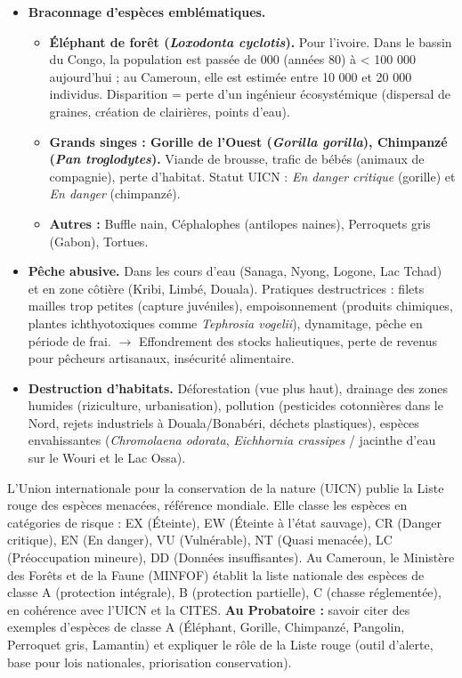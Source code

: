 \documentclass[11pt]{article}
\newcommand{\cle}[1]{{\popxbold\color{popdark}#1}}
\begin{document}
\begin{itemize}
    \item \textbf{Braconnage d'espèces emblématiques.}
    \begin{itemize}
        \item \textbf{Éléphant de forêt (\emph{Loxodonta cyclotis}).} Pour l'ivoire. Dans le bassin du Congo, la population est passée de  000 (années 80) à < 100 000 aujourd'hui ; au Cameroun, elle est estimée entre 10 000 et 20 000 individus. Disparition = perte d'un \cle{ingénieur écosystémique} (dispersal de graines, création de clairières, points d'eau).
        \item \textbf{Grands singes : Gorille de l'Ouest (\emph{Gorilla gorilla}), Chimpanzé (\emph{Pan troglodytes}).} Viande de brousse, trafic de bébés (animaux de compagnie), perte d'habitat. Statut UICN : \emph{En danger critique} (gorille) et \emph{En danger} (chimpanzé).
        \item \textbf{Autres :} Buffle nain, Céphalophes (antilopes naines), Perroquets gris (Gabon), Tortues.
    \end{itemize}
    \item \textbf{Pêche abusive.} Dans les cours d'eau (Sanaga, Nyong, Logone, Lac Tchad) et en zone côtière (Kribi, Limbé, Douala). Pratiques destructrices : filets mailles trop petites (capture juvéniles), empoisonnement (produits chimiques, plantes ichthyotoxiques comme \emph{Tephrosia vogelii}), dynamitage, pêche en période de frai. $\rightarrow$ Effondrement des stocks halieutiques, perte de revenus pour pêcheurs artisanaux, insécurité alimentaire.
    \item \textbf{Destruction d'habitats.} Déforestation (vue plus haut), drainage des zones humides (riziculture, urbanisation), pollution (pesticides cotonnières dans le Nord, rejets industriels à Douala/Bonabéri, déchets plastiques), espèces envahissantes (\emph{Chromolaena odorata}, \emph{Eichhornia crassipes} / jacinthe d'eau sur le Wouri et le Lac Ossa).
\end{itemize}

\begin{aretenir}
L'Union internationale pour la conservation de la nature (UICN) publie la \cle{Liste rouge des espèces menacées}, référence mondiale. Elle classe les espèces en catégories de risque : EX (Éteinte), EW (Éteinte à l'état sauvage), CR (Danger critique), EN (En danger), VU (Vulnérable), NT (Quasi menacée), LC (Préoccupation mineure), DD (Données insuffisantes). Au Cameroun, le Ministère des Forêts et de la Faune (MINFOF) établit la liste nationale des espèces de classe A (protection intégrale), B (protection partielle), C (chasse réglementée), en cohérence avec l'UICN et la CITES. \textbf{Au Probatoire :} savoir citer des exemples d'espèces de classe A (Éléphant, Gorille, Chimpanzé, Pangolin, Perroquet gris, Lamantin) et expliquer le rôle de la Liste rouge (outil d'alerte, base pour lois nationales, priorisation conservation).
\end{aretenir}
\end{document}
